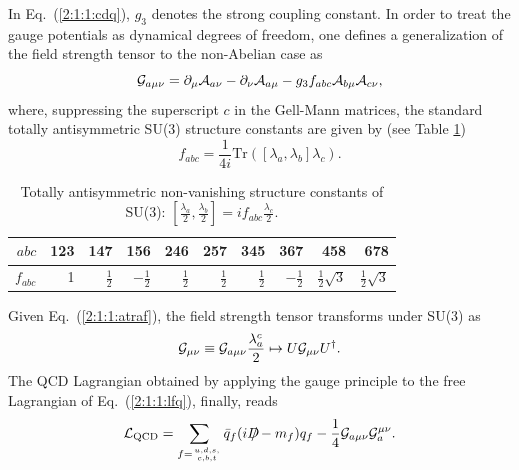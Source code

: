 \documentclass[twoside,12pt]{article}
\begin{document}
   In Eq.\ (\ref{2:1:1:cdq}), $g_3$ denotes the strong coupling constant.
   In order to treat the gauge potentials as dynamical degrees of freedom,
one defines a generalization of the field strength tensor to the non-Abelian case
as
\begin{equation}
\label{2:1:1:gmunu}
{\cal G}_{a\mu\nu}=\partial_\mu {\cal A}_{a\nu}-\partial_\nu {\cal A}_{a\mu}
-g_3 f_{abc}{\cal A}_{b\mu} {\cal A}_{c\nu},
\end{equation}
where, suppressing the superscript $c$ in the Gell-Mann matrices,
the standard totally antisymmetric SU(3) structure constants are given by
(see Table \ref{table:2:1:1:su3structurconstants})
\begin{equation}
\label{2:1:1:fabc}
f_{abc}=\frac{1}{4i}\mbox{Tr}([\lambda_a,\lambda_b]\lambda_c).
\end{equation}
\begin{table}[t]
\begin{center}
{\renewcommand{\baselinestretch}{1.5}\small\normalsize
\begin{tabular}{|r|r|r|r|r|r|r|r|r|r|}
\hline
$abc$&123&147&156&246&257&345&367&458&678\\
\hline
$f_{abc}$&1&$\frac{1}{2}$&$-\frac{1}{2}$&$\frac{1}{2}$&
$\frac{1}{2}$&$\frac{1}{2}$&$-\frac{1}{2}$&$\frac{1}{2}\sqrt{3}$&
$\frac{1}{2}\sqrt{3}$\\
\hline
\end{tabular}
}
\caption{\label{table:2:1:1:su3structurconstants}
Totally antisymmetric non-vanishing structure constants of SU(3):
$[\frac{\lambda_a}{2},\frac{\lambda_b}{2}]=if_{abc}\frac{\lambda_c}{2}$.
}
\end{center}
\end{table}
   Given Eq.\ (\ref{2:1:1:atraf}), the field strength tensor transforms under
SU(3) as
\begin{equation}
\label{2:1:1:gtrafo} {\cal G}_{\mu\nu}\equiv
{\cal G}_{a\mu\nu} \frac{\lambda_a^c}{2}\mapsto U{\cal G}_{\mu\nu}
U^\dagger.
\end{equation}
   The QCD Lagrangian obtained by applying the gauge principle to the
free Lagrangian of Eq.~(\ref{2:1:1:lfq}), finally, reads
\begin{equation}
\label{2:1:1:lqcd} {\cal L}_{\rm QCD}=\sum_{f={u,d,s, \atop c,b,t}}
\bar{q}_f(i D\hspace{-.6em}/ -m_f)q_f -\frac{1}{4}{\cal
G}_{a\mu\nu}{\cal G}^{\mu\nu}_a.
\end{equation}
\end{document}
